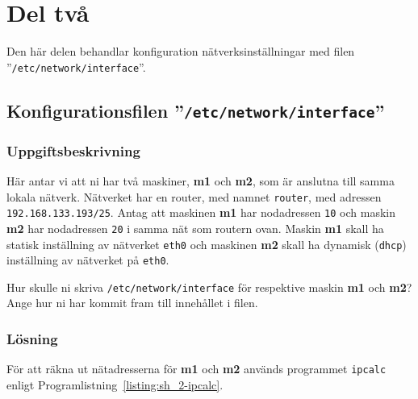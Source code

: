%
%
%


\section{Del två}
Den här delen behandlar konfiguration nätverksinställningar med filen
''\texttt{/etc/network/interface}''.


\subsection{Konfigurationsfilen ''\texttt{/etc/network/interface}''}
\subsubsection{Uppgiftsbeskrivning}
Här antar vi att ni har två maskiner, \textbf{m1} och \textbf{m2}, som är
anslutna till samma lokala nätverk.  Nätverket har en router, med namnet
\texttt{router}, med adressen \texttt{192.168.133.193/25}. Antag att maskinen
\textbf{m1} har nodadressen \texttt{10} och maskin \textbf{m2} har nodadressen
\texttt{20} i samma nät som routern ovan. Maskin \textbf{m1} skall ha statisk
inställning av nätverket \texttt{eth0} och maskinen \textbf{m2} skall ha
dynamisk (\texttt{dhcp}) inställning av nätverket på \texttt{eth0}.

Hur skulle ni skriva \texttt{/etc/network/interface} för respektive maskin
\textbf{m1} och \textbf{m2}?  Ange hur ni har kommit fram till innehållet i
filen.


\subsubsection{Lösning}
För att räkna ut nätadresserna för \textbf{m1} och \textbf{m2} används
programmet \texttt{ipcalc} enligt Programlistning~\ref{listing:sh_2-ipcalc}.

